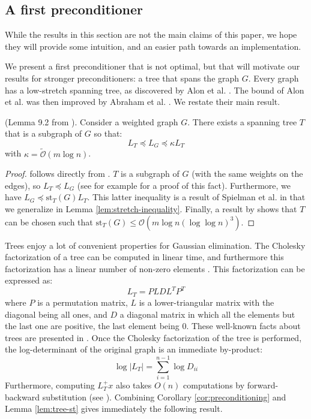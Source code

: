 
\subsection{A first preconditioner\label{sec:A-first-preconditioner}}

While the results in this section are not the main claims of this
paper, we hope they will provide some intuition, and an easier path
towards an implementation.

We present a first preconditioner that is not optimal, but that will
motivate our results for stronger preconditioners: a tree that spans
the graph $G$. Every graph has a low-stretch spanning tree, as discovered
by Alon et al. \cite{Alon1995}. The bound of Alon et al. was then
improved by Abraham et al. \cite{Abraham2008}. We restate their main
result.

\begin{lemma}(Lemma 9.2 from \cite{Spielman2009a}). Consider a weighted
graph $G$. There exists a spanning tree $T$ that is a subgraph of
$G$ so that: 
\[
L_{T}\preceq L_{G}\preceq\kappa L_{T}
\]
with $\kappa=\tilde{\mathcal{O}}\left(m\log n\right)$. %
\label{lem:tree-st} \end{lemma}

\begin{proof} 

follows directly from \cite{Spielman2009a}. $T$ is a subgraph of
$G$ (with the same weights on the edges), so $L_{T}\preceq L_{G}$
(see \cite{Spielman2009a} for example for a proof of this fact).
Furthermore, we have $L_{G}\preceq\text{st}_{T}\left(G\right)L_{T}$.
This latter inequality is a result of Spielman et al. in \cite{Spielman2010}
that we generalize in Lemma \ref{lem:stretch-inequality}. Finally,
a result by \cite{Abraham2008} shows that $T$ can be chosen such
that $\text{st}_{T}\left(G\right)\leq\mathcal{O}(m\log n(\log\log n)^{3})$.\end{proof}

Trees enjoy a lot of convenient properties for Gaussian elimination.
The Cholesky factorization of a tree can be computed in linear time,
and furthermore this factorization has a linear number of non-zero
elements \cite{Spielman2009a}. This factorization can be expressed
as: 
\[
L_{T}=PLDL^{T}P^{T}
\]
where $P$ is a permutation matrix, $L$ is a lower-triangular matrix
with the diagonal being all ones, and $D$ a diagonal matrix in which
all the elements but the last one are positive, the last element being
$0$. These well-known facts about trees are presented in \cite{Spielman2009a}.
Once the Cholesky factorization of the tree is performed, the log-determinant
of the original graph is an immediate by-product: 
\[
\log\left|L_{T}\right|=\sum_{i=1}^{n-1}\log D_{ii}
\]
Furthermore, computing $L_{T}^{+}x$ also takes $O\left(n\right)$
computations by forward-backward substitution (see \cite{duff1986direct}).
Combining Corollary \ref{cor:preconditioning} and Lemma \eqref{lem:tree-st}
gives immediately the following result.

